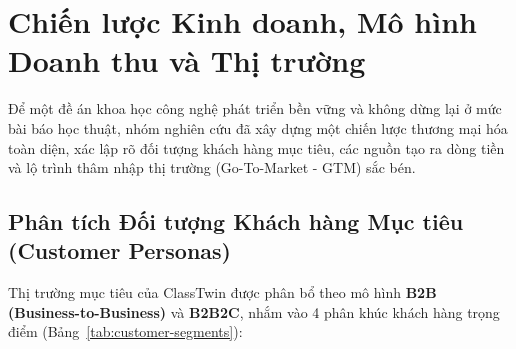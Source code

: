 \section{Chiến lược Kinh doanh, Mô hình Doanh thu và Thị trường}\label{sec:chien-luoc-kinh-doanh}


Để một đề án khoa học công nghệ phát triển bền vững và không dừng lại ở mức bài báo học thuật, nhóm nghiên cứu đã xây dựng một chiến lược thương mại hóa toàn diện, xác lập rõ đối tượng khách hàng mục tiêu, các nguồn tạo ra dòng tiền và lộ trình thâm nhập thị trường (Go-To-Market - GTM) sắc bén.

\subsection{Phân tích Đối tượng Khách hàng Mục tiêu (Customer Personas)}\label{subsec:khach-hang-muc-tieu}
Thị trường mục tiêu của ClassTwin được phân bổ theo mô hình \textbf{B2B (Business-to-Business)} và \textbf{B2B2C}, nhắm vào 4 phân khúc khách hàng trọng điểm (Bảng~\ref{tab:customer-segments}):

